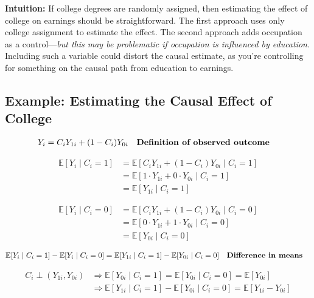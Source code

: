 \documentclass[12pt]{article}
\begin{document}
\textbf{Intuition:} If college degrees are randomly assigned, then estimating the effect of college on earnings should be straightforward. The first approach uses only college assignment to estimate the effect. The second approach adds occupation as a control—\textit{but this may be problematic if occupation is influenced by education}. Including such a variable could distort the causal estimate, as you're controlling for something on the causal path from education to earnings.

\singlespacing
\subsection*{\noindent\textbf{Example: Estimating the Causal Effect of College}}

\begin{align}
Y_i &= C_i Y_{1i} + (1 - C_i) Y_{0i} && \text{\textbf{Definition of observed outcome}}
\end{align}

\begin{align}
\mathbb{E}[Y_i \mid C_i = 1] &= \mathbb{E}[C_i Y_{1i} + (1 - C_i) Y_{0i} \mid C_i = 1] \\
                             &= \mathbb{E}[1 \cdot Y_{1i} + 0 \cdot Y_{0i} \mid C_i = 1] \\
                             &= \mathbb{E}[Y_{1i} \mid C_i = 1]
\end{align}

\begin{align}
\mathbb{E}[Y_i \mid C_i = 0] &= \mathbb{E}[C_i Y_{1i} + (1 - C_i) Y_{0i} \mid C_i = 0] \\
                             &= \mathbb{E}[0 \cdot Y_{1i} + 1 \cdot Y_{0i} \mid C_i = 0] \\
                             &= \mathbb{E}[Y_{0i} \mid C_i = 0]
\end{align}

\begin{align}
\mathbb{E}[Y_i \mid C_i = 1] - \mathbb{E}[Y_i \mid C_i = 0] 
&= \mathbb{E}[Y_{1i} \mid C_i = 1] - \mathbb{E}[Y_{0i} \mid C_i = 0] && \text{\textbf{Difference in means}}
\end{align}

\begin{align}
C_i \perp (Y_{1i}, Y_{0i}) &\Rightarrow \mathbb{E}[Y_{0i} \mid C_i = 1] = \mathbb{E}[Y_{0i} \mid C_i = 0] = \mathbb{E}[Y_{0i}] \\
                           &\Rightarrow \mathbb{E}[Y_{1i} \mid C_i = 1] - \mathbb{E}[Y_{0i} \mid C_i = 0] = \mathbb{E}[Y_{1i} - Y_{0i}]
\end{align}
\end{document}
